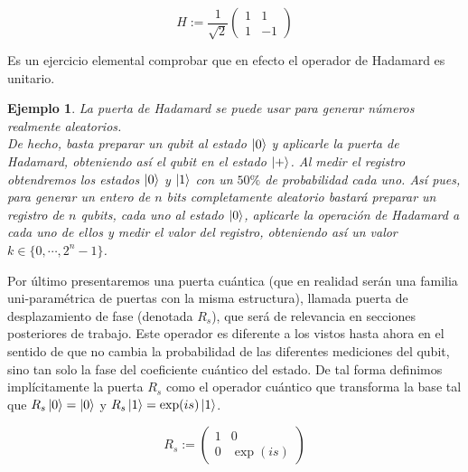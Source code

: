 \documentclass[11pt, spanish]{report}
\numberwithin{equation}{section}
\newtheorem{ejs}[defin]{Ejemplo}
\numberwithin{defin}{section}
\begin{document}
\begin{equation}
H:=\frac{1}{\sqrt{2}}\begin{pmatrix}
1 & 1 \\
1 & -1
\end{pmatrix}
\end{equation} 

Es un ejercicio elemental comprobar que en efecto el operador de Hadamard es unitario\footnotemark{}.


\begin{ejs}\label{aleatorio} La puerta de Hadamard se puede usar para generar números realmente aleatorios.\\

De hecho, basta preparar un qubit al estado $\ket{0}$ y aplicarle la puerta de Hadamard, obteniendo así el qubit en el estado $\ket{+}$. Al medir el registro obtendremos los estados $\ket{0}$ y $\ket{1}$ con un $50\%$ de probabilidad cada uno. Así pues, para generar un entero de $n$ bits completamente aleatorio bastará preparar un registro de $n$ qubits, cada uno al estado $\ket{0}$, aplicarle la operación de Hadamard a cada uno de ellos y medir el valor del registro, obteniendo así un valor $k\in\{0,\cdots,2^n-1\}$.
\end{ejs}

Por último presentaremos una puerta cuántica (que en realidad serán una familia uni-paramétrica de puertas con la misma estructura), llamada puerta de desplazamiento de fase (denotada $R_s$), que será de relevancia en secciones posteriores de trabajo. Este operador es diferente a los vistos hasta ahora en el sentido de que no cambia la probabilidad de las diferentes mediciones del qubit, sino tan solo la fase del coeficiente cuántico del estado. De tal forma definimos implícitamente la puerta $R_s$ como el operador cuántico que transforma la base tal que $R_s\ket{0}=\ket{0}$ y $R_s\ket{1}=\exp(is)\ket{1}$.

\begin{equation}
R_s:=\begin{pmatrix}
1 & 0 \\
0 & \exp(is)
\end{pmatrix}
\end{equation}
\end{document}
